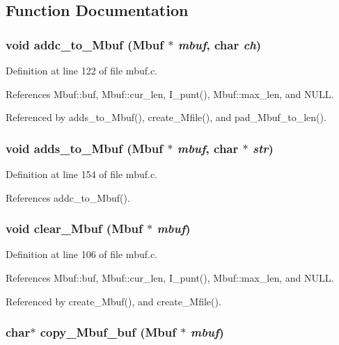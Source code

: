 \subsection{Function Documentation}
\subsubsection{\setlength{\rightskip}{0pt plus 5cm}void addc\_\-to\_\-Mbuf (\bf{Mbuf} $\ast$ {\em mbuf}, char {\em ch})}\label{mbuf_8c_c484945110f25490ddf1f1cee837545a}




Definition at line 122 of file mbuf.c.

References Mbuf::buf, Mbuf::cur\_\-len, I\_\-punt(), Mbuf::max\_\-len, and NULL.

Referenced by adds\_\-to\_\-Mbuf(), create\_\-Mfile(), and pad\_\-Mbuf\_\-to\_\-len().
\subsubsection{\setlength{\rightskip}{0pt plus 5cm}void adds\_\-to\_\-Mbuf (\bf{Mbuf} $\ast$ {\em mbuf}, char $\ast$ {\em str})}\label{mbuf_8c_69f1edaf9698fff3c71661de842e77a5}




Definition at line 154 of file mbuf.c.

References addc\_\-to\_\-Mbuf().
\subsubsection{\setlength{\rightskip}{0pt plus 5cm}void clear\_\-Mbuf (\bf{Mbuf} $\ast$ {\em mbuf})}\label{mbuf_8c_5622b2609033c4d9593f1e930efc6de1}




Definition at line 106 of file mbuf.c.

References Mbuf::buf, Mbuf::cur\_\-len, I\_\-punt(), Mbuf::max\_\-len, and NULL.

Referenced by create\_\-Mbuf(), and create\_\-Mfile().
\subsubsection{\setlength{\rightskip}{0pt plus 5cm}char$\ast$ copy\_\-Mbuf\_\-buf (\bf{Mbuf} $\ast$ {\em mbuf})}\label{mbuf_8c_86e194177b3d1029d56c24a08ff0e288}




